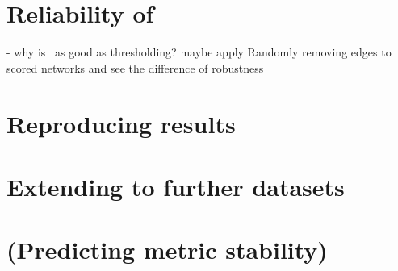 \section{Reliability of \graffs}

- why is~ as good as thresholding?
maybe apply Randomly removing edges to scored networks and see the difference of robustness


\section{Reproducing results}


\section{Extending to further datasets}


\section{(Predicting metric stability)}
